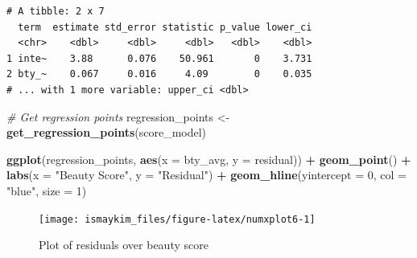 \documentclass[12pt, krantz2,]{krantz}
\makeatletter
\newenvironment{Shaded}{\begin{snugshade}}{\end{snugshade}}
\newcommand{\CommentTok}[1]{\textcolor[rgb]{0.37,0.37,0.37}{\textit{#1}}}
\newcommand{\DataTypeTok}[1]{\textcolor[rgb]{0.27,0.27,0.27}{#1}}
\newcommand{\DecValTok}[1]{\textcolor[rgb]{0.06,0.06,0.06}{#1}}
\newcommand{\KeywordTok}[1]{\textcolor[rgb]{0.27,0.27,0.27}{\textbf{#1}}}
\newcommand{\NormalTok}[1]{#1}
\newcommand{\OperatorTok}[1]{\textcolor[rgb]{0.43,0.43,0.43}{\textbf{#1}}}
\newcommand{\StringTok}[1]{\textcolor[rgb]{0.5,0.5,0.5}{#1}}
\newenvironment{kframe}{%
\medskip{}
\setlength{\fboxsep}{.8em}
 \def\at@end@of@kframe{}%
 \ifinner\ifhmode%
  \def\at@end@of@kframe{\end{minipage}}%
  \begin{minipage}{\columnwidth}%
 \fi\fi%
 \def\FrameCommand##1{\hskip\@totalleftmargin \hskip-\fboxsep
 \colorbox{shadecolor}{##1}\hskip-\fboxsep
     \hskip-\linewidth \hskip-\@totalleftmargin \hskip\columnwidth}%
 \MakeFramed {\advance\hsize-\width
   \@totalleftmargin\z@ \linewidth\hsize
   \@setminipage}}%
 {\par\unskip\endMakeFramed%
 \at@end@of@kframe}
\renewenvironment{Shaded}{\begin{kframe}}{\end{kframe}}
\makeatother
\begin{document}
\begin{Shaded}
\end{Shaded}

\begin{verbatim}
# A tibble: 2 x 7
  term  estimate std_error statistic p_value lower_ci
  <chr>    <dbl>     <dbl>     <dbl>   <dbl>    <dbl>
1 inte~    3.88      0.076    50.961       0    3.731
2 bty_~    0.067     0.016     4.09        0    0.035
# ... with 1 more variable: upper_ci <dbl>
\end{verbatim}

\begin{Shaded}
\begin{Highlighting}[]
\CommentTok{# Get regression points}
\NormalTok{regression_points <-}\StringTok{ }\KeywordTok{get_regression_points}\NormalTok{(score_model)}
\end{Highlighting}
\end{Shaded}

\begin{Shaded}
\begin{Highlighting}[]
\KeywordTok{ggplot}\NormalTok{(regression_points, }\KeywordTok{aes}\NormalTok{(}\DataTypeTok{x =}\NormalTok{ bty_avg, }\DataTypeTok{y =}\NormalTok{ residual)) }\OperatorTok{+}
\StringTok{  }\KeywordTok{geom_point}\NormalTok{() }\OperatorTok{+}
\StringTok{  }\KeywordTok{labs}\NormalTok{(}\DataTypeTok{x =} \StringTok{"Beauty Score"}\NormalTok{, }\DataTypeTok{y =} \StringTok{"Residual"}\NormalTok{) }\OperatorTok{+}
\StringTok{  }\KeywordTok{geom_hline}\NormalTok{(}\DataTypeTok{yintercept =} \DecValTok{0}\NormalTok{, }\DataTypeTok{col =} \StringTok{"blue"}\NormalTok{, }\DataTypeTok{size =} \DecValTok{1}\NormalTok{)}
\end{Highlighting}
\end{Shaded}

\begin{figure}

{\centering \texttt{[image: ismaykim\_files/figure-latex/numxplot6-1]} 

}

\caption{Plot of residuals over beauty score}\label{fig:numxplot6}
\end{figure}
\end{document}
